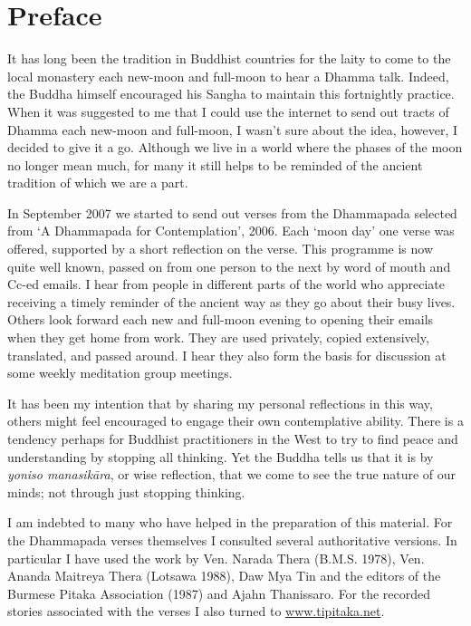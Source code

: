 
\chapter{Preface}

It has long been the tradition in Buddhist countries for the laity to
come to the local monastery each new-moon and full-moon to hear a Dhamma
talk. Indeed, the Buddha himself encouraged his Sangha to maintain this
fortnightly practice. When it was suggested to me that I could use the
internet to send out tracts of Dhamma each new-moon and full-moon, I
wasn't sure about the idea, however, I decided to give it a go. Although
we live in a world where the phases of the moon no longer mean much, for
many it still helps to be reminded of the ancient tradition of which we
are a part.

In September 2007 we started to send out verses from the Dhammapada
selected from `A Dhammapada for Contemplation', 2006. Each `moon day'
one verse was offered, supported by a short reflection on the verse.
This programme is now quite well known, passed on from one person to the
next by word of mouth and Cc-ed emails. I hear from people in different
parts of the world who appreciate receiving a timely reminder of the
ancient way as they go about their busy lives. Others look forward each
new and full-moon evening to opening their emails when they get home
from work. They are used privately, copied extensively, translated, and
passed around. I hear they also form the basis for discussion at some
weekly meditation group meetings.

It has been my intention that by sharing my personal reflections in this
way, others might feel encouraged to engage their own contemplative
ability. There is a tendency perhaps for Buddhist practitioners in the
West to try to find peace and understanding by stopping all thinking.
Yet the Buddha tells us that it is by \emph{yoniso manasikāra}, or wise
reflection, that we come to see the true nature of our minds; not
through just stopping thinking.

I am indebted to many who have helped in the preparation of this
material. For the Dhammapada verses themselves I consulted several
authoritative versions. In particular I have used the work by Ven.
Narada Thera (B.M.S. 1978), Ven. Ananda Maitreya Thera (Lotsawa 1988),
Daw Mya Tin and the editors of the Burmese Pitaka Association (1987) and
Ajahn Thanissaro. For the recorded stories associated with the verses I
also turned to \href{http://www.tipitaka.net/}{www.tipitaka.net}.

